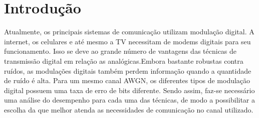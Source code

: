 \newpage
\section{Introdução}
Atualmente, os principais sistemas de comunicação utilizam modulação digital. A internet, os celulares e até mesmo a TV necessitam de modems digitais para seu funcionamento. Isso se deve ao grande número de vantagens das técnicas de transmissão digital em relação as analógicas.Embora bastante robustas contra ruídos, as modulações digitais também perdem informação quando a quantidade de ruído é alta. Para um mesmo canal AWGN, os diferentes tipos de modulação digital possuem uma taxa de erro de bits diferente. Sendo assim, faz-se necessário uma análise do desempenho para cada uma das técnicas, de modo a possibilitar a escolha da que melhor atenda as necessidades de comunicação no canal utilizado.
